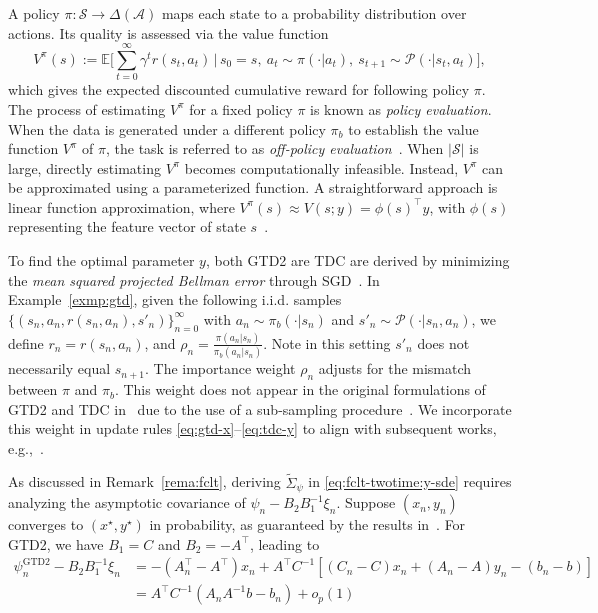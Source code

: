 \documentclass[11pt]{article}
\theoremstyle{plain}
\theoremstyle{definition}
\def\AM{{\mathcal A}}
\def\PM{{\mathcal P}}
\def\SM{{\mathcal S}}
\def\EB{{\mathbb E}}
\def\psia{\psi^{\mathrm{GTD2}}}
\begin{document}
\begin{appendix}
A policy $\pi\colon \SM \rightarrow \Delta(\AM)$ maps each state to a probability distribution over actions. Its quality is assessed via the value function  $$V^\pi(s) := \EB \bigg[ \sum_{t=0}^\infty \gamma^t r(s_t, a_t) \,|\, s_0 = s,\ a_t \sim \pi(\cdot|a_t),\ s_{t+1} \sim \PM(\cdot|s_t,a_t) \bigg], $$
which gives the expected discounted cumulative reward for following policy $\pi$. 
The process of estimating $V^\pi$ for a fixed policy $\pi$ is known as \textit{policy evaluation}.
When the data is generated under a different policy $\pi_b$ to establish the value function $V^\pi$ of $\pi$, the task is referred to as \textit{off-policy evaluation}~\citep{uehara2022review}.
When $|\SM|$ is large, directly estimating $V^\pi$ becomes computationally infeasible. Instead, $V^\pi$ can be approximated using a parameterized function. A straightforward approach is linear function approximation, where
$V^\pi(s) \approx V(s;y) = \phi(s)^\top y$, with $\phi(s)$ representing the feature vector of state $s$~\citep{dann2014policy}.

To find the optimal parameter $y$, both GTD2 are TDC are derived by minimizing the
\textit{mean squared projected Bellman error} through SGD~\cite{sutton2009fast}.
In Example~\ref{exmp:gtd},
given the following i.i.d. samples $\{ (s_n, a_n, r(s_n, a_n), s'_{n}) \}_{n=0}^\infty$ with $a_n \sim \pi_b(\cdot | s_n)$ and $s'_{n} \sim \PM(\cdot|s_{n}, a_{n})$, we define $r_{n} = r(s_n, a_n)$, and $\rho_{n} = \frac{\pi(a_n|s_n)}{\pi_b(a_n|s_n)}$.
Note in this setting $s'_n$ does not necessarily equal $s_{n+1}$.
The importance weight $\rho_{n}$ adjusts for the mismatch between $\pi$ and $\pi_b$.
This weight does not appear in the original formulations of GTD2 and TDC in~\cite{sutton2009fast} due to the use of a sub-sampling procedure~\citep{maei2011gradient}.
We incorporate this weight in update rules \eqref{eq:gtd-x}--\eqref{eq:tdc-y} to align with subsequent works, e.g.,~\cite{xu2019two, li2024high}.

As discussed in Remark~\ref{rema:fclt}, deriving $\widetilde{\Sigma}_{\psi}$ in \eqref{eq:fclt-twotime:y-sde} requires analyzing the asymptotic covariance of $\psi_{n} - B_2 B_1^{-1} \xi_{n} $.
Suppose $(x_n, y_n)$ converges to $(x^\star, y^\star)$ in probability, as guaranteed by the results in~\cite{maei2011gradient}. For GTD2, we have $B_1 = C$ and $B_2 = -A^\top$, leading to
\begin{align*}
\psia_{n} - B_2 B_1^{-1} \xi_{n} 
& = -(A_{n}^\top {-} A^\top) x_{n} + A^\top C^{-1} [ (C_n {-} C) x_{n} + (A_n {-} A)y_{n} - (b_{n} {-} b) ] \\
& = A^\top C^{-1} ( A_{n} A^{-1} b - b_{n} ) + o_p(1)
\end{align*}


\end{appendix}
\end{document}
